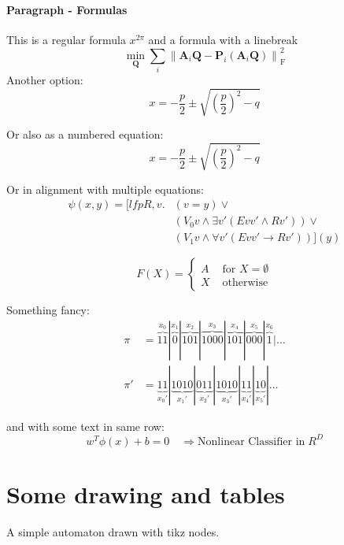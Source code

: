 \documentclass{CSSHThesis}
\begin{document}
\paragraph{Paragraph - Formulas}
This is a regular formula $ x^{2 \pi}$ and a formula with a linebreak 
\[ \min_{\mathbf{Q}} \sum_i \left\| \mathbf{A}_i \mathbf{Q} - \mathbf{P}_i(\mathbf{A}_i \mathbf{Q}) \right\|^2_\mathrm{F} \]
Another option:
$$
x = -\frac{p}{2} \pm \sqrt{(\frac{p}{2})^2 -q}
$$

Or also as a numbered equation:
\begin{equation}
	x = -\frac{p}{2} \pm \sqrt{(\frac{p}{2})^2 -q}
\end{equation}

Or in alignment with multiple equations:
\begin{align*}
	\psi(x,y) = [lfp R, v. &(v = y) \vee \\
        &(V_0 v \wedge \exists v' (Evv' \wedge Rv')) \vee\\
        &(V_1 v \wedge \forall v' (Evv' \rightarrow Rv'))](y)
\end{align*}

\[F(X) = \begin{cases}
	A & \mbox{ for } X = \emptyset\\
	X & \mbox{ otherwise}
\end{cases}\]

Something fancy:
\begin{align*}
	\pi  &= \overbrace{11}^{x_0}|\overbrace{0}^{x_1}|\overbrace{101}^{x_2}|\overbrace{100 0}^{x_3}|\overbrace{101}^{x_4}|\overbrace{00 0}^{x_5}|\overbrace{1}^{x_6}|\ldots\\
	\pi' &= \underbrace{11}_{x_0'}|\underbrace{1 010}_{x_1'}|\underbrace{011}_{x_2'}|\underbrace{1 010}_{x_3'}|\underbrace{11}_{x_4'}|\underbrace{1 0}_{x_5'}|\ldots
\end{align*}

and with some text in same row:
\begin{equation*}
    w^T \phi(x) + b =0 \quad \Rightarrow \text{Nonlinear Classifier in} \; R^D
\end{equation*}



\section{Some drawing and tables}
A simple automaton drawn with tikz nodes.\\ 
\end{document}
